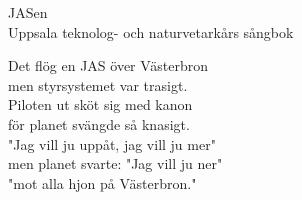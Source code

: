   {\Large JASen}\\{\tiny  Uppsala teknolog- och naturvetarkårs sångbok}
  \begin{vers}
Det flög en JAS över Västerbron \\
men styrsystemet var trasigt. \\
Piloten ut sköt sig med kanon \\
för planet svängde så knasigt. \\
"Jag vill ju uppåt, jag vill ju mer" \\
men planet svarte: "Jag vill ju ner" \\
"mot alla hjon på Västerbron." \\
\end{vers}
